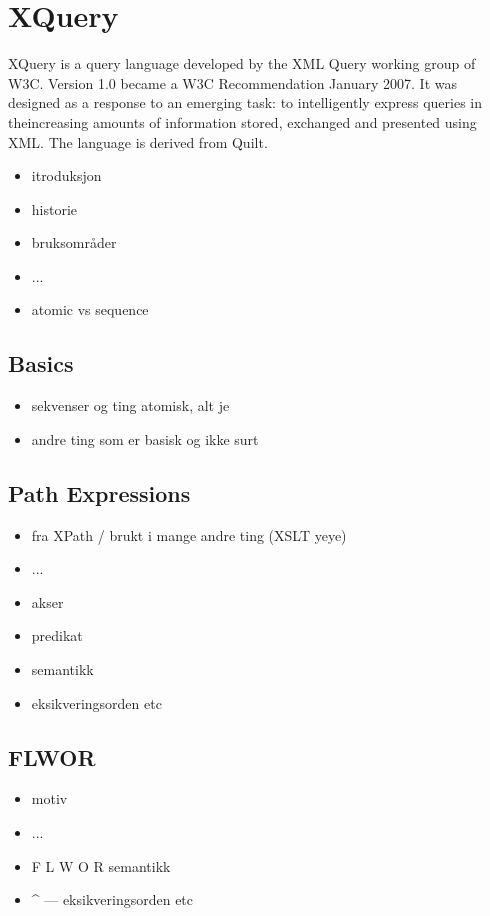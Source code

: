 \section{XQuery}
\label{sect:xquery}

XQuery is a query language developed by the XML Query working group of W3C.
Version 1.0\cite{w3c00} became a W3C Recommendation January 2007. It was designed as a
response to an emerging task: to intelligently express queries in theincreasing
amounts of information stored, exchanged and presented using XML. The language
is derived from Quilt\cite{quilt_queryLanguage}.


\begin{itemize}
\item itroduksjon
\item historie
\item bruksomr\aa der
\item ...
\item atomic vs sequence
\end{itemize}

\subsection{Basics}
\begin{itemize}
  \item sekvenser og ting atomisk, alt je
  \item andre ting som er basisk og ikke surt
\end{itemize}

\subsection{Path Expressions}
\label{sect:theory:xqueryPathExpressions}
\begin{itemize}
\item fra XPath / brukt i mange andre ting (XSLT yeye)
\item ...
\item akser
\item predikat
\item semantikk 
\item eksikveringsorden etc
\end{itemize}

\subsection{FLWOR}

\begin{itemize}
\item motiv
\item ...
\item F L W O R semantikk
\item \^{} --- eksikveringsorden etc
\end{itemize}

